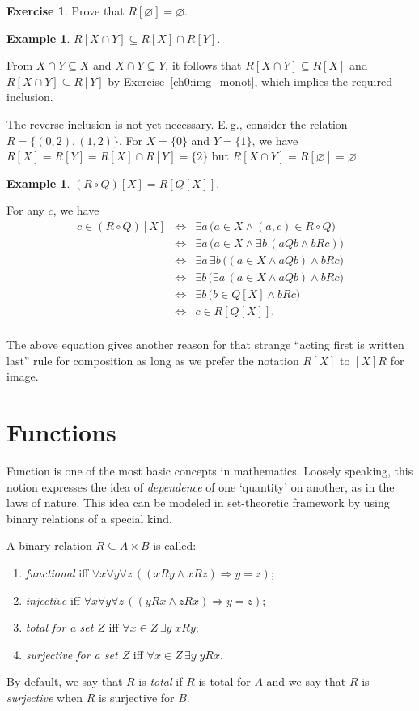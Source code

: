 \documentclass[12pt,notitlepage]{article}
\theoremstyle{plain}
\theoremstyle{definition}
\newtheorem{exc}[thm]{Exercise}
\newtheorem{exm}[thm]{Example}
\theoremstyle{plain}
\newcommand{\sbs}{\subseteq}
\newcommand{\void}{\varnothing}
\newcommand{\1}{\mathbf{1}}
\newcommand{\0}{\mathbf{0}}
\newcommand{\ply}{\Longrightarrow}
\begin{document}
\begin{exc}
Prove that $R[\void] = \void$.
\end{exc}

\begin{exm}\label{ch0:exm25}
$R[X \cap Y] \sbs R[X] \cap R[Y]$.

From $X \cap Y \sbs X$ and $X \cap Y \sbs Y$, it follows that $R[X \cap Y] \sbs R[X]$ and $R[X \cap Y] \sbs R[Y]$ by Exercise~\ref{ch0:img_monot}, which implies the required inclusion.

The reverse inclusion is not yet necessary. E.\,g., consider the relation $R = \{(0,2), (1,2)\}$. For $X = \{0\}$ and $Y = \{1\}$, we have $R[X] = R[Y] = R[X] \cap R[Y]  = \{2\}$ but $R[X \cap Y] = R[\void] = \void$.
\end{exm}

\begin{exm}
$(R \circ Q)[X] = R[Q[X]]$.

For any $c$, we have
$$
\begin{array}{rcl}
c \in (R \circ Q)[X] &\iff& \exists a\, \bigl( a \in X \wedge (a,c) \in R \circ Q \bigr)\\
&\iff& \exists a\, \bigl( a \in X \wedge \exists b\, ( a Q b \wedge b R c) \bigr)\\
&\iff& \exists a\, \exists b\,\bigl( (a \in X \wedge a Q b) \wedge b R c \bigr)\\
&\iff& \exists b\, \bigl( \exists a\, (a \in X \wedge a Q b) \wedge b R c \bigr)\\
&\iff& \exists b\, \bigl( b \in Q[X] \wedge b R c \bigr)\\
&\iff& c \in R[Q[X]].\\
\end{array}
$$
\end{exm}
The above equation gives another reason for that strange ``acting first is written last'' rule for composition as long as we prefer the notation $R[X]$ to $[X]R$ for image. 
\section{Functions}
Function is one of the most basic concepts in mathematics. Loosely speaking, this notion expresses the idea of \emph{dependence} of one `quantity' on another, as in the laws of nature. This idea can be modeled in set-theoretic framework by using binary relations of a special kind.

A binary relation $R \sbs A \times B$ is called:
\begin{enumerate}
\item \emph{functional} iff $\forall x \forall y \forall z\, ( (x R y \wedge x R z) \ply y = z )$;
\item \emph{injective} iff $\forall x \forall y \forall z\, ( (y R x \wedge z R x) \ply y = z )$;
\item \emph{total for a set $Z$} iff $\forall x \in Z\, \exists y\; x R y$;
\item \emph{surjective for a set $Z$} iff $\forall x \in Z\, \exists y\; y R x$.
\end{enumerate}
By default, we say that $R$ is \emph{total} if $R$ is total for $A$ and we say that $R$ is \emph{surjective} when $R$ is surjective for $B$.
\end{document}
